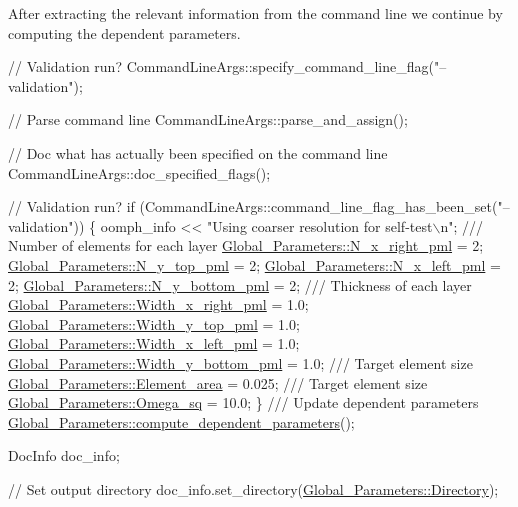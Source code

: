 After extracting the relevant information from the command line we continue by computing the dependent parameters.


\begin{DoxyCodeInclude}
 \textcolor{comment}{// Validation run?}
 CommandLineArgs::specify\_command\_line\_flag(\textcolor{stringliteral}{"--validation"});

 \textcolor{comment}{// Parse command line}
 CommandLineArgs::parse\_and\_assign(); 
 
 \textcolor{comment}{// Doc what has actually been specified on the command line}
 CommandLineArgs::doc\_specified\_flags();

 \textcolor{comment}{// Validation run?}
 \textcolor{keywordflow}{if} (CommandLineArgs::command\_line\_flag\_has\_been\_set(\textcolor{stringliteral}{"--validation"}))
  \{
   oomph\_info << \textcolor{stringliteral}{"Using coarser resolution for self-test\(\backslash\)n"};
   \textcolor{comment}{}
\textcolor{comment}{   /// Number of elements for each layer}
\textcolor{comment}{}   \hyperlink{namespaceGlobal__Parameters_a401ab27b40efe725bc047909ae65b4b1}{Global\_Parameters::N\_x\_right\_pml}  = 2;
   \hyperlink{namespaceGlobal__Parameters_ade86fec7e40fc9a5330e6213482f09d6}{Global\_Parameters::N\_y\_top\_pml}    = 2;
   \hyperlink{namespaceGlobal__Parameters_accf11b5794502b15efd0aa37347f6994}{Global\_Parameters::N\_x\_left\_pml}   = 2; 
   \hyperlink{namespaceGlobal__Parameters_a79bff9b8e3435255541b71c0e3cc30a1}{Global\_Parameters::N\_y\_bottom\_pml} = 2; 
\textcolor{comment}{}
\textcolor{comment}{   /// Thickness of each layer}
\textcolor{comment}{}   \hyperlink{namespaceGlobal__Parameters_a140b1b8aaef0bf2b94acf75d681d4545}{Global\_Parameters::Width\_x\_right\_pml}  = 1.0;
   \hyperlink{namespaceGlobal__Parameters_a175759402c54bb216b0599c6a031abea}{Global\_Parameters::Width\_y\_top\_pml}    = 1.0;
   \hyperlink{namespaceGlobal__Parameters_a28925335dcc7b2bed01d744a543be9aa}{Global\_Parameters::Width\_x\_left\_pml}   = 1.0;
   \hyperlink{namespaceGlobal__Parameters_a67848e80f63ec793108a4710a28cc3a9}{Global\_Parameters::Width\_y\_bottom\_pml} = 1.0;
\textcolor{comment}{}
\textcolor{comment}{   /// Target element size}
\textcolor{comment}{}   \hyperlink{namespaceGlobal__Parameters_af365b0769e142cabdaed848057332858}{Global\_Parameters::Element\_area}  = 0.025;
\textcolor{comment}{}
\textcolor{comment}{   /// Target element size}
\textcolor{comment}{}   \hyperlink{namespaceGlobal__Parameters_af9e1e178dfb7f5e35b452599bd4c4324}{Global\_Parameters::Omega\_sq}  = 10.0;
  \}
\textcolor{comment}{}
\textcolor{comment}{ /// Update dependent parameters}
\textcolor{comment}{} \hyperlink{namespaceGlobal__Parameters_aafb6ae2e2642a42a7c8ce999837d18b1}{Global\_Parameters::compute\_dependent\_parameters}();

 DocInfo doc\_info;
 
 \textcolor{comment}{// Set output directory}
 doc\_info.set\_directory(\hyperlink{namespaceGlobal__Parameters_a301ab922df72030c660b21328d6caf76}{Global\_Parameters::Directory});

\end{DoxyCodeInclude}


